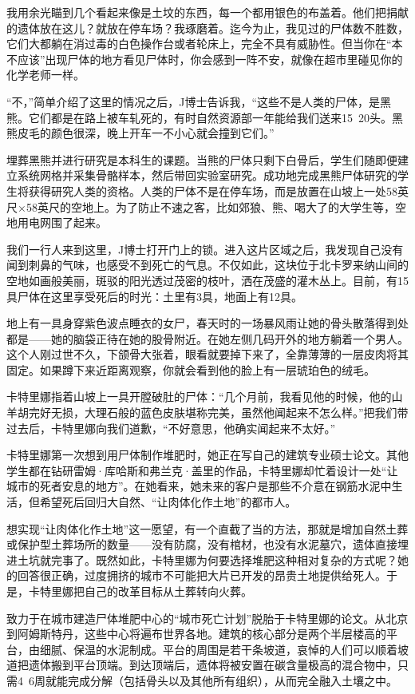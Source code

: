 \documentclass[12pt,oneside]{book}
\begin{document}
\begin{bookref}[frametitle={\cite{好好告别}}]
我用余光瞄到几个看起来像是土坟的东西，每一个都用银色的布盖着。他们把捐献的遗体放在这儿？就放在停车场？我琢磨着。迄今为止，我见过的尸体数不胜数，它们大都躺在消过毒的白色操作台或者轮床上，完全不具有威胁性。但当你在“本不应该”出现尸体的地方看见尸体时，你会感到一阵不安，就像在超市里碰见你的化学老师一样。

“不，”简单介绍了这里的情况之后，J博士告诉我，“这些不是人类的尸体，是黑熊。它们都是在路上被车轧死的，有时自然资源部一年能给我们送来15~20头。黑熊皮毛的颜色很深，晚上开车一不小心就会撞到它们。”

埋葬黑熊并进行研究是本科生的课题。当熊的尸体只剩下白骨后，学生们随即便建立系统网格并采集骨骼样本，然后带回实验室研究。成功地完成黑熊尸体研究的学生将获得研究人类的资格。人类的尸体不是在停车场，而是放置在山坡上一处58英尺×58英尺的空地上。为了防止不速之客，比如郊狼、熊、喝大了的大学生等，空地用电网围了起来。

我们一行人来到这里，J博士打开门上的锁。进入这片区域之后，我发现自己没有闻到刺鼻的气味，也感受不到死亡的气息。不仅如此，这块位于北卡罗来纳山间的空地如画般美丽，斑驳的阳光透过茂密的枝叶，洒在茂盛的灌木丛上。目前，有15具尸体在这里享受死后的时光：土里有3具，地面上有12具。

地上有一具身穿紫色波点睡衣的女尸，春天时的一场暴风雨让她的骨头散落得到处都是——她的脑袋正待在她的股骨附近。在她左侧几码开外的地方躺着一个男人。这个人刚过世不久，下颌骨大张着，眼看就要掉下来了，全靠薄薄的一层皮肉将其固定。如果蹲下来近距离观察，你就会看到他的脸上有一层琥珀色的绒毛。

卡特里娜指着山坡上一具开膛破肚的尸体：“几个月前，我看见他的时候，他的山羊胡完好无损，大理石般的蓝色皮肤堪称完美，虽然他闻起来不怎么样。”把我们带过去后，卡特里娜向我们道歉，“不好意思，他确实闻起来不太好。”

卡特里娜第一次想到用尸体制作堆肥时，她正在写自己的建筑专业硕士论文。其他学生都在钻研雷姆·库哈斯和弗兰克·盖里的作品，卡特里娜却忙着设计一处“让城市的死者安息的地方”。在她看来，她未来的客户是那些不介意在钢筋水泥中生活，但希望死后回归大自然、“让肉体化作土地”的都市人。

想实现“让肉体化作土地”这一愿望，有一个直截了当的方法，那就是增加自然土葬或保护型土葬场所的数量——没有防腐，没有棺材，也没有水泥墓穴，遗体直接埋进土坑就完事了。既然如此，卡特里娜为何要选择堆肥这种相对复杂的方式呢？她的回答很正确，过度拥挤的城市不可能把大片已开发的昂贵土地提供给死人。于是，卡特里娜把自己的改革目标从土葬转向火葬。

致力于在城市建造尸体堆肥中心的“城市死亡计划”脱胎于卡特里娜的论文。从北京到阿姆斯特丹，这些中心将遍布世界各地。建筑的核心部分是两个半层楼高的平台，由细腻、保温的水泥制成。平台的周围是若干条坡道，哀悼的人们可以顺着坡道把遗体搬到平台顶端。到达顶端后，遗体将被安置在碳含量极高的混合物中，只需4~6周就能完成分解（包括骨头以及其他所有组织），从而完全融入土壤之中。


\end{bookref}
\end{document}

